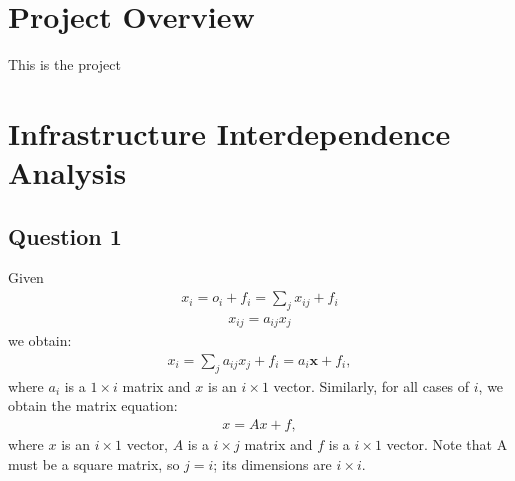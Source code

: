 \documentclass[11pt,a4paper]{article}
\begin{document}
\graphicspath{ {../figures/} }

\maketitle

\section{Project Overview}
This is the project
\section{Infrastructure Interdependence Analysis}

\subsection*{Question 1}
Given
\begin{align}
	x_i = o_i + f_i = \sum_{j} x_{ij} + f_i
\end{align}
\begin{align}
	x_{ij} = a_{ij}x_{j}
\end{align}
we obtain:
\begin{align*}
	x_i = \sum_{j} a_{ij}x_{j} + f_i = a_{i}\bm{x} + f_i,
\end{align*}
where $a_i$ is a $1 \times i$ matrix and $x$ is an $i \times 1$ vector. Similarly, for all cases of $i$, we obtain the matrix equation:
\begin{align} \label{eq: EIO Equation}
	x = Ax + f,
\end{align}
where $x$ is an $i \times 1$ vector, $A$ is a $i \times j$ matrix and $f$ is a $i \times 1$ vector. Note that A must be a square matrix, so $j=i$; its dimensions are $i \times i$.
\end{document}
